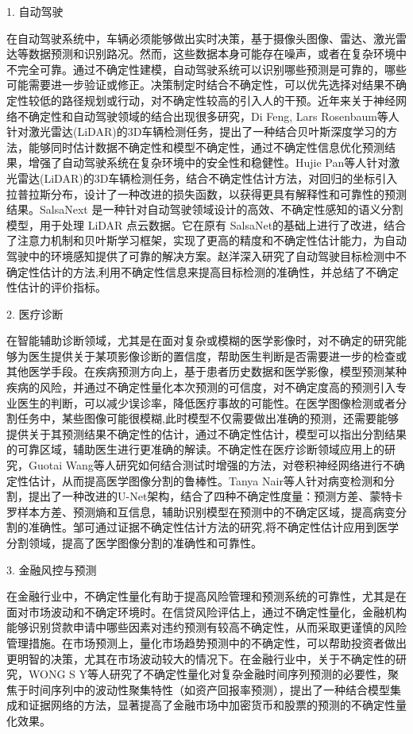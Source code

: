 1. 自动驾驶

在自动驾驶系统中，车辆必须能够做出实时决策，基于摄像头图像、雷达、激光雷达等数据预测和识别路况。然而，这些数据本身可能存在噪声，或者在复杂环境中不完全可靠。通过不确定性建模，自动驾驶系统可以识别哪些预测是可靠的，哪些可能需要进一步验证或修正。决策制定时结合不确定性，可以优先选择对结果不确定性较低的路径规划或行动，对不确定性较高的引入人的干预。近年来关于神经网络不确定性和自动驾驶领域的结合出现很多研究，Di Feng, Lars Rosenbaum等人\cite{feng2018towards}针对激光雷达(LiDAR)的3D车辆检测任务，提出了一种结合贝叶斯深度学习的方法，能够同时估计数据不确定性和模型不确定性，通过不确定性信息优化预测结果，增强了自动驾驶系统在复杂环境中的安全性和稳健性。Hujie Pan等人\cite{pan2020towards}针对激光雷达(LiDAR)的3D车辆检测任务，结合不确定性估计方法，对回归的坐标引入拉普拉斯分布，设计了一种改进的损失函数，以获得更具有解释性和可靠性的预测结果。SalsaNext\cite{cortinhal2020salsanext} 是一种针对自动驾驶领域设计的高效、不确定性感知的语义分割模型，用于处理 LiDAR 点云数据。它在原有 SalsaNet\cite{Aksoy2019SalsaNetFR}的基础上进行了改进，结合了注意力机制和贝叶斯学习框架，实现了更高的精度和不确定性估计能力，为自动驾驶中的环境感知提供了可靠的解决方案。赵洋\cite{QCYK202405002}深入研究了自动驾驶目标检测中不确定性估计的方法,利用不确定性信息来提高目标检测的准确性，并总结了不确定性估计的评价指标。

2. 医疗诊断

在智能辅助诊断领域，尤其是在面对复杂或模糊的医学影像时，对不确定的研究能够为医生提供关于某项影像诊断的置信度，帮助医生判断是否需要进一步的检查或其他医学手段。在疾病预测方向上，基于患者历史数据和医学影像，模型预测某种疾病的风险，并通过不确定性量化本次预测的可信度，对不确定度高的预测引入专业医生的判断，可以减少误诊率，降低医疗事故的可能性。在医学图像检测或者分割任务中，某些图像可能很模糊,此时模型不仅需要做出准确的预测，还需要能够提供关于其预测结果不确定性的估计，通过不确定性估计，模型可以指出分割结果的可靠区域，辅助医生进行更准确的解读。不确定性在医疗诊断领域应用上的研究，Guotai Wang等人\cite{wang2019aleatoric}研究如何结合测试时增强的方法，对卷积神经网络进行不确定性估计，从而提高医学图像分割的鲁棒性。Tanya Nair等人\cite{nair2020exploring}针对病变检测和分割，提出了一种改进的U-Net架构，结合了四种不确定性度量：预测方差、蒙特卡罗样本方差、预测熵和互信息，辅助识别模型在预测中的不确定区域，提高病变分割的准确性。邹可\cite{1024642336.nh}通过证据不确定性估计方法的研究,将不确定性估计应用到医学分割领域，提高了医学图像分割的准确性和可靠性。


3. 金融风控与预测

在金融行业中，不确定性量化有助于提高风险管理和预测系统的可靠性，尤其是在面对市场波动和不确定环境时。在信贷风险评估上，通过不确定性量化，金融机构能够识别贷款申请中哪些因素对违约预测有较高不确定性，从而采取更谨慎的风险管理措施。在市场预测上，量化市场趋势预测中的不确定性，可以帮助投资者做出更明智的决策，尤其在市场波动较大的情况下。在金融行业中，关于不确定性的研究，WONG S Y等人\cite{wong2025quantifying}研究了不确定性量化对复杂金融时间序列预测的必要性，聚焦于时间序列中的波动性聚集特性（如资产回报率预测），提出了一种结合模型集成和证据网络的方法，显著提高了金融市场中加密货币和股票的预测的不确定性量化效果。

